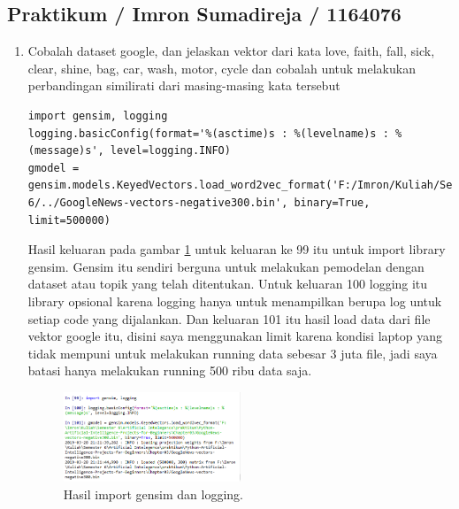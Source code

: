 \subsection{Praktikum / Imron Sumadireja / 1164076}
\begin{enumerate}
\item Cobalah dataset google, dan jelaskan vektor dari kata love, faith, fall, sick, clear, shine, bag, car, wash, motor, cycle dan cobalah untuk melakukan perbandingan similirati dari masing-masing kata tersebut \par
\begin{verbatim}
import gensim, logging
logging.basicConfig(format='%(asctime)s : %(levelname)s : %(message)s', level=logging.INFO)
gmodel = gensim.models.KeyedVectors.load_word2vec_format('F:/Imron/Kuliah/Semester 6/../GoogleNews-vectors-negative300.bin', binary=True, limit=500000)
\end{verbatim}
Hasil keluaran pada gambar \ref{sim1} untuk keluaran ke 99 itu untuk import library gensim. Gensim itu sendiri berguna untuk melakukan pemodelan dengan dataset atau topik yang telah ditentukan. Untuk keluaran 100 logging itu library opsional karena logging hanya untuk menampilkan berupa log untuk setiap code yang dijalankan. Dan keluaran 101 itu hasil load data dari file vektor google itu, disini saya menggunakan limit karena kondisi laptop yang tidak mempuni untuk melakukan running data sebesar 3 juta file, jadi saya batasi hanya melakukan running 500 ribu data saja.
		\begin{figure}[ht]
		\centerline{\includegraphics[width=0.5\textwidth]{figures/im/sim1.png}}
		\caption{Hasil import gensim dan logging.}
		\label{sim1}
		\end{figure}


\end{enumerate}
